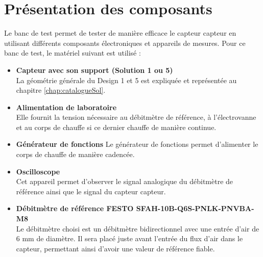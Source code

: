 \section{Présentation des composants}
Le banc de test permet de tester de manière efficace le capteur \gls{capteur} en utilisant différents composants électroniques et appareils de 
mesures. Pour ce banc de test, le matériel suivant est utilisé :
\begin{itemize}
    \item \textbf{Capteur avec son support (Solution 1 ou 5)}\\
          La géométrie générale du Design 1 et 5 est expliquée et représentée au chapitre \ref*{chap:catalogueSol}. \\
          
    \item \textbf{Alimentation de laboratoire}\\
          Elle fournit la tension nécessaire au débitmètre de référence, à l'électrovanne et au corps de chauffe si ce dernier chauffe de manière 
          continue. \\
          
    \item \textbf{Générateur de fonctions}
          Le générateur de fonctions permet d'alimenter le corps de chauffe de manière cadencée. \\
          
    \item \textbf{Oscilloscope}\\
          Cet appareil permet d'observer le signal analogique du débitmètre de référence ainsi que le signal du capteur \gls{capteur}. \\
          
    \item \textbf{Débitmètre de référence FESTO SFAH-10B-Q6S-PNLK-PNVBA-M8}\\
          Le débitmètre choisi est un débitmètre bidirectionnel avec une entrée d'air de 6 mm de diamètre. Il sera placé juste avant l'entrée du flux
          d'air dans le capteur, permettant ainsi d'avoir une valeur de référence fiable.\\
          

\end{itemize}
